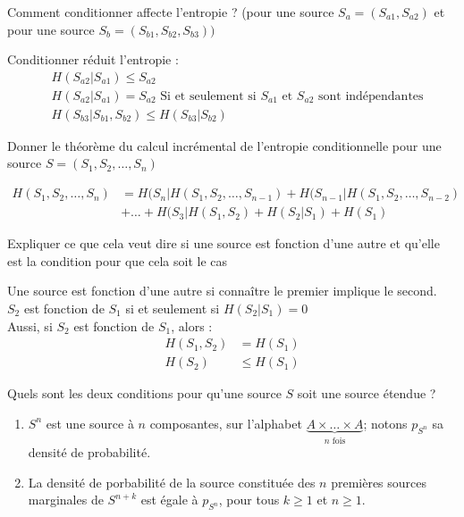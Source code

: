 \documentclass[12pt]{article}
\newcommand*{\xfield}[1]{\begin{mdframed}\centering #1\end{mdframed}\bigskip}
\newenvironment{note}{}{}
\begin{document}
\begin{note}
	\xfield{Comment conditionner affecte l'entropie ? (pour une source $S_a=(S_{a1},S_{a2})$ et pour une source $S_b=(S_{b1},S_{b2},S_{b3}))$}
	\xfield{Conditionner réduit l'entropie :
	\begin{align*}
	&H(S_{a2} |S_{a1}) \le S_{a2}\\
	&H(S_{a2} | S_{a1}) = S_{a2} \text{ Si et seulement si $S_{a1}$ et $S_{a2}$ sont indépendantes}\\
	&H(S_{b3}|S_{b1},S_{b2}) \le H(S_{b3}|S_{b2})
	\end{align*}}
\end{note}
\begin{note}
\xfield{Donner le théorème du calcul incrémental de l'entropie conditionnelle pour une source $S=(S_1,S_2,\hdots,S_n)$}
\xfield{\begin{align*}
H(S_1,S_2,\hdots,S_n) &= H(S_n|H(S_1,S_2,\hdots,S_{n-1}) +  H(S_{n-1}|H(S_1,S_2,\hdots,S_{n-2})\\
&+ \hdots + H(S_3|H(S_1,S_2) + H(S_2|S_1) + H(S_1)
\end{align*}
}
\end{note}
\begin{note}
	\xfield{Expliquer ce que cela veut dire si une source est fonction d'une autre et qu'elle est la condition pour que cela soit le cas}
	\xfield{Une source est fonction d'une autre si connaître le premier implique le second.\\
	$S_2$ est fonction de $S_1$ si et seulement si $H(S_2|S_1) = 0$\\
	Aussi, si $S_2$ est fonction de $S_1$, alors :
	\begin{align*}
	H(S_1,S_2) &= H(S_1)\\
	H(S_2) &\le H(S_1)
	\end{align*}}
\end{note}

\begin{note}
	\xfield{Quels sont les deux conditions pour qu'une source $S$ soit une source étendue ?}
	\xfield{\begin{enumerate}
	\item $S^n$ est une source à $n$ composantes, sur l'alphabet $\underbrace{A\times \hdots \times A}_{n \text{ fois}}$; notons $p_{S^n}$ sa densité de probabilité.
	\item La densité de porbabilité de la source constituée des $n$ premières sources marginales de $S^{n+k}$ est égale à $p_{S^n}$, pour tous $k \ge 1$ et $n\ge 1$.
	\end{enumerate}}
\end{note}
\end{document}
